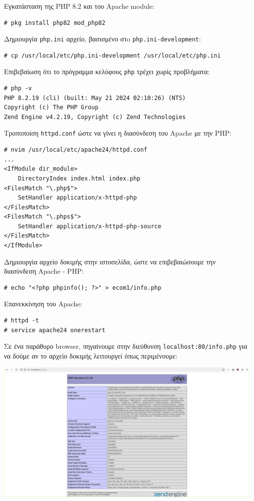 \documentclass[12pt]{article}
\begin{document}
Εγκατάσταση της PHP 8.2 και του Apache module:

\begin{lstlisting}
# pkg install php82 mod_php82
\end{lstlisting}

Δημιουργία \lstinline{php.ini} αρχείο, βασισμένο στo
\lstinline{php.ini-development}:

\begin{lstlisting}
# cp /usr/local/etc/php.ini-development /usr/local/etc/php.ini
\end{lstlisting}

Επιβεβαίωση ότι το πρόγραμμα κελύφους \lstinline{php} τρέχει χωρίς προβλήματα:

\begin{lstlisting}
# php -v
PHP 8.2.19 (cli) (built: May 21 2024 02:10:26) (NTS)
Copyright (c) The PHP Group
Zend Engine v4.2.19, Copyright (c) Zend Technologies
\end{lstlisting}

Τροποποίση \lstinline{httpd.conf} ώστε να γίνει η διασύνδεση του Apache με την
PHP:

\begin{lstlisting}
# nvim /usr/local/etc/apache24/httpd.conf
...
<IfModule dir_module>
    DirectoryIndex index.html index.php
<FilesMatch "\.php$">
    SetHandler application/x-httpd-php
</FilesMatch>
<FilesMatch "\.phps$">
    SetHandler application/x-httpd-php-source
</FilesMatch>
</IfModule>
\end{lstlisting}

Δημιουργία αρχείο δοκιμής στην ιστοσελίδα, ώστε να επιβεβαιώσουμε την
διασύνδεση Apache - PHP:

\begin{lstlisting}
# echo "<?php phpinfo(); ?>" > ecom1/info.php
\end{lstlisting}

Επανεκκίνηση του Apache:

\begin{lstlisting}
# httpd -t
# service apache24 onerestart
\end{lstlisting}

Σε ένα παράθυρο browser, πηγαίνουμε στην διεύθυνση
\lstinline{localhost:80/info.php} για να δούμε αν το αρχείο δοκιμής λειτουργεί
όπως περιμένουμε:

\includegraphics[width=\textwidth]{res/phpinfo.png} \\
\end{document}
